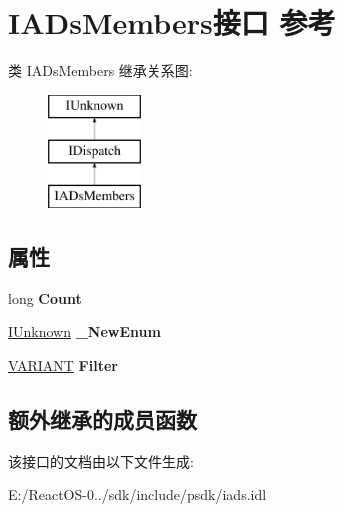 \hypertarget{interface_i_a_ds_members}{}\section{I\+A\+Ds\+Members接口 参考}
\label{interface_i_a_ds_members}
类 I\+A\+Ds\+Members 继承关系图\+:\begin{figure}[H]
\begin{center}
\leavevmode
\includegraphics[height=3.000000cm]{interface_i_a_ds_members}
\end{center}
\end{figure}
\subsection*{属性}
\begin{DoxyCompactItemize}
\item 
\mbox{\label{interface_i_a_ds_members_a57eee9a13a19ab785d376eb548031411}} 
long {\bfseries Count}
\item 
\mbox{\label{interface_i_a_ds_members_a3b1ece4e60185e45ffd6ab222f243ece}} 
\hyperlink{interface_i_unknown}{I\+Unknown} {\bfseries \+\_\+\+New\+Enum}
\item 
\mbox{\label{interface_i_a_ds_members_afaf9bdd4985b3e45e8e6caeb7a32197b}} 
\hyperlink{structtag_v_a_r_i_a_n_t}{V\+A\+R\+I\+A\+NT} {\bfseries Filter}
\end{DoxyCompactItemize}
\subsection*{额外继承的成员函数}


该接口的文档由以下文件生成\+:\begin{DoxyCompactItemize}
\item 
E\+:/\+React\+O\+S-\/0../sdk/include/psdk/iads.\+idl\end{DoxyCompactItemize}
